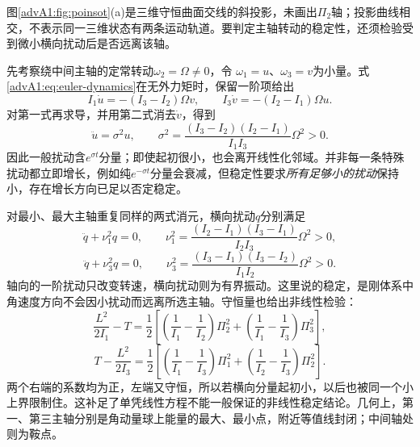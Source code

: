 图\ref{advA1:fig:poinsot}(a)是三维守恒曲面交线的斜投影，未画出$\Pi_2$轴；投影曲线相交，不表示同一三维状态有两条运动轨道。要判定主轴转动的稳定性，还须检验受到微小横向扰动后是否远离该轴。

先考察绕中间主轴的定常转动$\omega_2=\Omega\ne0$，令
$\omega_1=u$、$\omega_3=v$为小量。式\eqref{advA1:eq:euler-dynamics}在无外力矩时，保留一阶项给出
\[
 I_1\dot u=-(I_3-I_2)\Omega v,\qquad
 I_3\dot v=-(I_2-I_1)\Omega u.
\]
对第一式再求导，并用第二式消去$\dot v$，得到
\[
 \ddot u=\sigma^2u,\qquad
 \sigma^2=\frac{(I_3-I_2)(I_2-I_1)}{I_1I_3}\Omega^2>0.
\]
因此一般扰动含$e^{\sigma t}$分量；即使起初很小，也会离开线性化邻域。并非每一条特殊扰动都立即增长，例如纯$e^{-\sigma t}$分量会衰减，但稳定性要求\emph{所有足够小的扰动}保持小，存在增长方向已足以否定稳定。

对最小、最大主轴重复同样的两式消元，横向扰动$q$分别满足
\[
 \ddot q+\nu_1^2q=0,\qquad
 \nu_1^2=\frac{(I_2-I_1)(I_3-I_1)}{I_2I_3}\Omega^2>0,
\]
\[
 \ddot q+\nu_3^2q=0,\qquad
 \nu_3^2=\frac{(I_3-I_1)(I_3-I_2)}{I_1I_2}\Omega^2>0.
\]
轴向的一阶扰动只改变转速，横向扰动则为有界振动。这里说的稳定，是刚体系中角速度方向不会因小扰动而远离所选主轴。守恒量也给出非线性检验：
\[
 \frac{L^2}{2I_1}-T
 =\frac12\left[\left(\frac1{I_1}-\frac1{I_2}\right)\Pi_2^2
              +\left(\frac1{I_1}-\frac1{I_3}\right)\Pi_3^2\right],
\]
\[
 T-\frac{L^2}{2I_3}
 =\frac12\left[\left(\frac1{I_1}-\frac1{I_3}\right)\Pi_1^2
              +\left(\frac1{I_2}-\frac1{I_3}\right)\Pi_2^2\right].
\]
两个右端的系数均为正，左端又守恒，所以若横向分量起初小，以后也被同一个小上界限制住。这补足了单凭线性方程不能一般保证的非线性稳定结论。几何上，第一、第三主轴分别是角动量球上能量的最大、最小点，附近等值线封闭；中间轴处则为鞍点。

